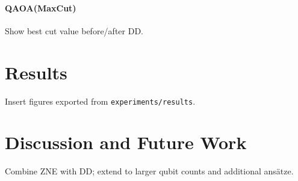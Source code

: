 \documentclass[11pt]{article}
\begin{document}
\paragraph{QAOA(MaxCut)} Show best cut value before/after DD.

\section{Results}
Insert figures exported from \texttt{experiments/results}.

\section{Discussion and Future Work}
Combine ZNE with DD; extend to larger qubit counts and additional ans\"atze.



\end{document}
